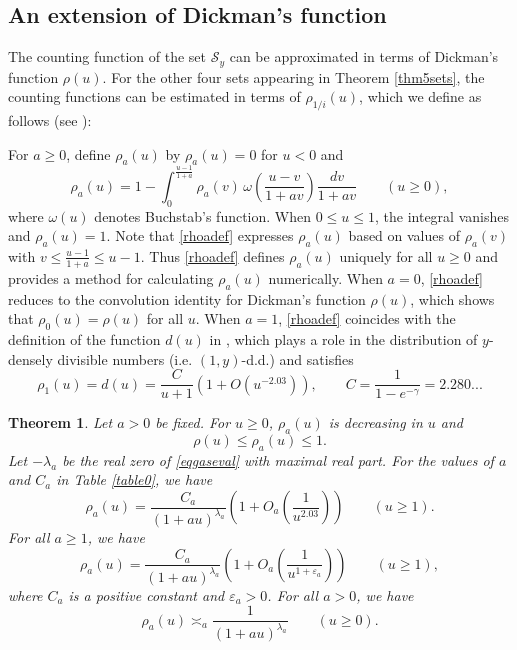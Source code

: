 \documentclass[11pt]{amsart}
\newtheorem{theorem}{Theorem}
\begin{document}
\subsection{An extension of Dickman's function}

The counting function of the set $\mathcal{S}_y$ can be approximated in terms of Dickman's function $\rho(u)$. 
For the other four sets appearing in Theorem \ref{thm5sets}, the counting functions can be estimated in terms of $\rho_{1/i}(u)$, which we define as follows
(see \cite[Thm. 2.9]{Sar}):

For $a\ge 0$, define $\rho_a(u)$ by $\rho_a(u)=0$ for $u<0$ and 
\begin{equation}\label{rhoadef}
\rho_a(u) = 1-\int_0^{\frac{u-1}{1+a}}  \rho_a(v)\, \omega\left(\frac{u-v}{1+av}\right) \frac{dv}{1+av} \qquad (u\ge 0),
\end{equation}
where $\omega(u)$ denotes Buchstab's function.
When $0\le u\le 1$, the integral vanishes and $\rho_a(u)=1$. 
Note that  \eqref{rhoadef} expresses $\rho_a(u)$ based on values of 
$\rho_a(v)$ with $v\le \frac{u-1}{1+a} \le u-1$. 
Thus \eqref{rhoadef} defines $\rho_a(u)$ uniquely for all $u\ge 0$ and provides a method for calculating $\rho_a(u)$ numerically. 
When $a=0$, \eqref{rhoadef} reduces to the convolution identity \cite[Exercise 297]{Ten} for Dickman's function $\rho(u)$, which shows that 
$\rho_0(u)=\rho(u)$ for all $u$. 
When $a=1$, \eqref{rhoadef} coincides with the definition of the function $d(u)$ in \cite{IDD3, PDD},
which plays a role in the distribution of $y$-densely divisible numbers (i.e. $(1,y)$-d.d.) and satisfies
$$
\rho_1(u)=d(u)=\frac{C}{u+1}\left(1+O(u^{-2.03})\right), \qquad C=\frac{1}{1-e^{-\gamma}}=2.280...
$$



\begin{theorem}\label{rhoathm}
Let $a>0$ be fixed. For $u\ge 0$, $\rho_a(u)$ is decreasing in $u$ and 
$$
\rho(u) \le \rho_a(u) \le 1.
$$
Let $-\lambda_a$ be the real zero of \eqref{eqgaseval} with maximal real part.
For the  values of $a$ and $C_a$ in Table \ref{table0}, we have
\begin{equation}\label{rhoasymp0}
\rho_a(u) = \frac{C_a}{(1+au)^{\lambda_a}}\left(1+O_a\left(\frac{1}{u^{2.03}}\right)\right) \qquad (u\ge 1).
\end{equation}
For all $a\ge 1$,  we have
\begin{equation}\label{rhoasymp1}
\rho_a(u) = \frac{C_a}{(1+au)^{\lambda_a}}\left(1+O_a\left(\frac{1}{u^{1+\varepsilon_a}}\right)\right) \qquad (u\ge 1),
\end{equation}
where $C_a$ is a positive constant and $\varepsilon_a >0$. 
For all $a>0$, we have
\begin{equation}\label{rhoasymp2}
\rho_a(u) \asymp_a  \frac{1}{(1+au)^{\lambda_a}}\qquad (u\ge 0).
\end{equation}
\end{theorem}
\end{document}
